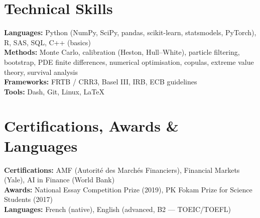 \section{Technical Skills}
\begin{itemize}[leftmargin=0.15in, label={}]
  \small{\item{
    \textbf{Languages:} Python (NumPy, SciPy, pandas, scikit-learn, statsmodels, PyTorch), R, SAS, SQL, C++ (basics) \\
    \textbf{Methods:} Monte Carlo, calibration (Heston, Hull--White), particle filtering, bootstrap, PDE finite differences, numerical optimisation, copulas, extreme value theory, survival analysis \\
    \textbf{Frameworks:} FRTB / CRR3, Basel III, IRB, ECB guidelines \\
    \textbf{Tools:} Dash, Git, Linux, \LaTeX
  }}
\end{itemize}

\section{Certifications, Awards \& Languages}
\begin{itemize}[leftmargin=0.15in, label={}]
  \small{\item{
    \textbf{Certifications:} AMF (Autorit\'e des March\'es Financiers), Financial Markets (Yale), AI in Finance (World Bank) \\
    \textbf{Awards:} National Essay Competition Prize (2019), PK Fokam Prize for Science Students (2017) \\
    \textbf{Languages:} French (native), English (advanced, B2 --- TOEIC/TOEFL)
  }}
\end{itemize}


